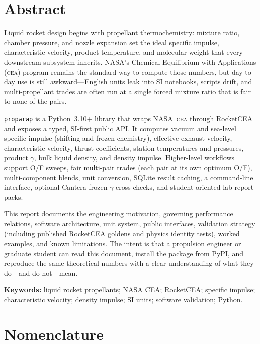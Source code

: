 \documentclass[11pt,a4paper]{report}
\newcommand{\pw}{\texttt{propwrap}}
\newcommand{\cea}{\textsc{cea}}
\begin{document}
\chapter*{Abstract}
\noindent
Liquid rocket design begins with propellant thermochemistry: mixture ratio,
chamber pressure, and nozzle expansion set the ideal specific impulse,
characteristic velocity, product temperature, and molecular weight that every
downstream subsystem inherits. NASA's Chemical Equilibrium with Applications
(\cea{}) program remains the standard way to compute those numbers, but
day-to-day use is still awkward---English units leak into SI notebooks, scripts
drift, and multi-propellant trades are often run at a single forced mixture
ratio that is fair to none of the pairs.

\pw{} is a Python~3.10+ library that wraps NASA~\cea{} through RocketCEA and
exposes a typed, SI-first public API. It computes vacuum and sea-level
specific impulse (shifting and frozen chemistry), effective exhaust velocity,
characteristic velocity, thrust coefficients, station temperatures and
pressures, product $\gamma$, bulk liquid density, and density impulse. Higher-level
workflows support O/F sweeps, fair multi-pair trades (each pair at its own
optimum O/F), multi-component blends, unit conversion, SQLite result caching,
a command-line interface, optional Cantera frozen-$\gamma$ cross-checks, and
student-oriented lab report packs.

This report documents the engineering motivation, governing performance
relations, software architecture, unit system, public interfaces, validation
strategy (including published RocketCEA goldens and physics identity tests),
worked examples, and known limitations. The intent is that a propulsion engineer
or graduate student can read this document, install the package from PyPI, and
reproduce the same theoretical numbers with a clear understanding of what they
do---and do not---mean.

\vspace{0.8em}
\noindent\textbf{Keywords:}
liquid rocket propellants; NASA CEA; RocketCEA; specific impulse; characteristic
velocity; density impulse; SI units; software validation; Python.

\newpage
\chapter*{Nomenclature}
\end{document}
